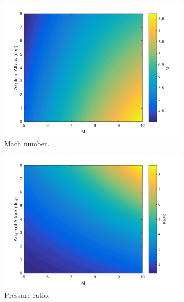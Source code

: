 \begin{figure}
\begin{subfigure}{.5\textwidth}
\centering
\includegraphics[width=0.99\linewidth]{figures/3_vehicle_design/ConicalM}
\caption{Mach number.}
\label{fig:ConicalM}
\end{subfigure}
\begin{subfigure}{.5\textwidth}
\centering
\includegraphics[width=0.99\linewidth]{figures/3_vehicle_design/ConicalP}
\caption{Pressure ratio.}
\label{fig:ConicalP}
\end{subfigure}
\begin{subfigure}{.5\textwidth}
\centering

\end{subfigure}
\end{figure}
